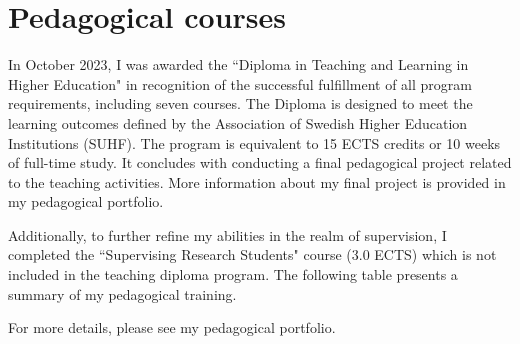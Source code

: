 \newpage
\section{Pedagogical courses}{}

In October 2023, I was awarded the ``Diploma in Teaching and Learning in Higher Education" in recognition of the successful fulfillment of all program requirements, including seven courses. The Diploma is designed to meet the learning outcomes defined by the Association of Swedish Higher Education Institutions (SUHF). The program is equivalent to 15 ECTS credits or 10 weeks of full-time study. It concludes with conducting a final pedagogical project related to the teaching activities. More information about my final project is provided in my pedagogical portfolio.

Additionally, to further refine my abilities in the realm of supervision, I completed the ``Supervising Research Students" course (3.0 ECTS) which is not included in the teaching diploma program. The following table presents a summary of my pedagogical training.

For more details, please see my pedagogical portfolio.
%

